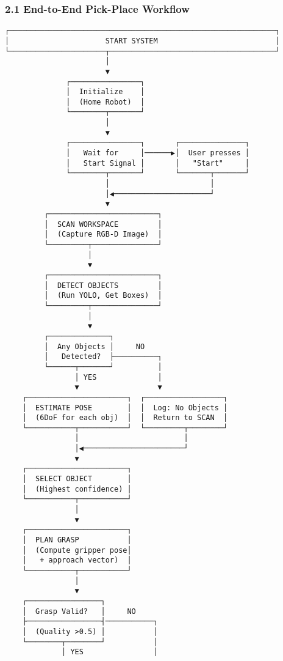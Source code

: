 \documentclass[
]{article}
\begin{document}
\hypertarget{end-to-end-pick-place-workflow}{%
\subsubsection{2.1 End-to-End Pick-Place
Workflow}\label{end-to-end-pick-place-workflow}}

\begin{verbatim}
┌─────────────────────────────────────────────────────────────┐
│                      START SYSTEM                           │
└──────────────────────┬──────────────────────────────────────┘
                       │
                       ▼
              ┌────────────────┐
              │  Initialize    │
              │  (Home Robot)  │
              └────────┬───────┘
                       │
                       ▼
              ┌────────────────┐       ┌───────────────┐
              │   Wait for     │──────▶│  User presses │
              │   Start Signal │       │   "Start"     │
              └────────┬───────┘       └───────┬───────┘
                       │                       │
                       │◀──────────────────────┘
                       ▼
         ┌─────────────────────────┐
         │  SCAN WORKSPACE         │
         │  (Capture RGB-D Image)  │
         └─────────┬───────────────┘
                   │
                   ▼
         ┌─────────────────────────┐
         │  DETECT OBJECTS         │
         │  (Run YOLO, Get Boxes)  │
         └─────────┬───────────────┘
                   │
                   ▼
         ┌──────────────┐
         │  Any Objects │     NO
         │   Detected?  ├──────────┐
         └──────┬───────┘          │
                │ YES              │
                ▼                  ▼
    ┌───────────────────────┐  ┌──────────────────┐
    │  ESTIMATE POSE        │  │  Log: No Objects │
    │  (6DoF for each obj)  │  │  Return to SCAN  │
    └───────────┬───────────┘  └─────────┬────────┘
                │                        │
                │◀───────────────────────┘
                ▼
    ┌───────────────────────┐
    │  SELECT OBJECT        │
    │  (Highest confidence) │
    └───────────┬───────────┘
                │
                ▼
    ┌───────────────────────┐
    │  PLAN GRASP           │
    │  (Compute gripper pose│
    │   + approach vector)  │
    └───────────┬───────────┘
                │
                ▼
    ┌─────────────────┐
    │  Grasp Valid?   │     NO
    ├─────────────────┤───────────┐
    │  (Quality >0.5) │           │
    └────────┬────────┘           │
             │ YES                │

\end{verbatim}
\end{document}
